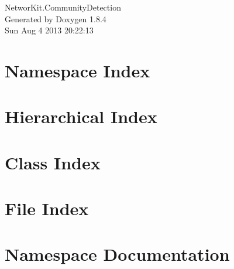 \documentclass[twoside]{book}
\newcommand{\clearemptydoublepage}{%
  \newpage{\pagestyle{empty}\cleardoublepage}%
}
\begin{document}
\hypersetup{pageanchor=false}
\begin{titlepage}
\vspace*{7cm}
\begin{center}%
{\Large Networ\-Kit.\-Community\-Detection }\\
\vspace*{1cm}
{\large Generated by Doxygen 1.8.4}\\
\vspace*{0.5cm}
{\small Sun Aug 4 2013 20:22:13}\\
\end{center}
\end{titlepage}
\clearemptydoublepage
\tableofcontents
\clearemptydoublepage
{}
\hypersetup{pageanchor=true}

\chapter{Namespace Index}

\chapter{Hierarchical Index}

\chapter{Class Index}

\chapter{File Index}

\chapter{Namespace Documentation}



\end{document}

